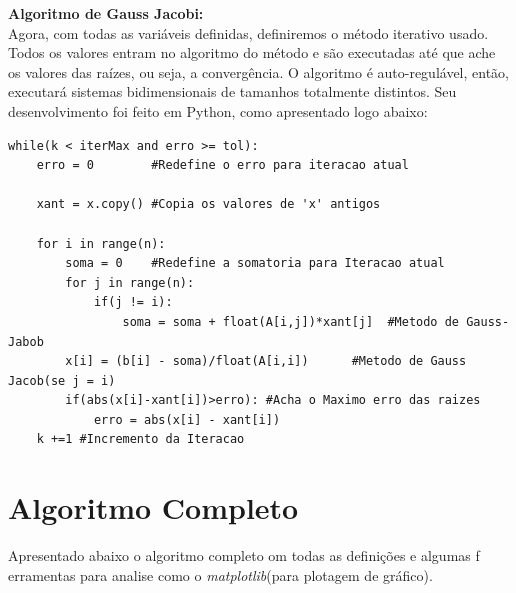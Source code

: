 \documentclass[
	12pt,				%
	openright,			%
	twoside,			%
	a4paper,			%
	english,			%
	french,				%
	spanish,			%
	brazil				%
	]{abntex2_new}
\begin{document}
\begin{alineas}
{}

\item{\textbf{Algoritmo de Gauss Jacobi:}\\
	Agora, com todas as variáveis definidas, definiremos o método iterativo usado. Todos os
	valores entram no algoritmo do método e são executadas até que ache os valores das raízes, ou seja, a convergência.
	O algoritmo é auto-regulável, então, executará sistemas bidimensionais de tamanhos totalmente distintos.
	Seu desenvolvimento foi feito em Python, como apresentado logo abaixo:\\
	\begin{lstlisting}
while(k < iterMax and erro >= tol):
	erro = 0		#Redefine o erro para iteracao atual
	
	xant = x.copy() #Copia os valores de 'x' antigos
	
	for i in range(n):
		soma = 0	#Redefine a somatoria para Iteracao atual
		for j in range(n):
			if(j != i):
				soma = soma + float(A[i,j])*xant[j]  #Metodo de Gauss-Jabob
		x[i] = (b[i] - soma)/float(A[i,i])		#Metodo de Gauss Jacob(se j = i)
		if(abs(x[i]-xant[i])>erro):	#Acha o Maximo erro das raizes
			erro = abs(x[i] - xant[i])
	k +=1 #Incremento da Iteracao
	\end{lstlisting}
	
}	
\end{alineas}

\section{Algoritmo Completo}
Apresentado abaixo o algoritmo completo om todas as definições e algumas f
erramentas para analise como o \textit{matplotlib}(para plotagem de gráfico).


\end{document}
